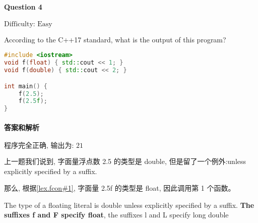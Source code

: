 \documentclass{article}
\begin{document}
	\paragraph*{Question 4} $\boxed{\text{Difficulty: Easy}} $			
	
	According to the C++17 standard, what is the output of this program?
	
	\begin{lstlisting}[language=C++]  		
#include <iostream>
void f(float) { std::cout << 1; }
void f(double) { std::cout << 2; }

int main() {
	f(2.5);
	f(2.5f);
}
	\end{lstlisting}
	
	
	\paragraph*{答案和解析} $\boxed{\text{程序完全正确, 输出为: 21}} $
	
	上一题我们说到, 字面量浮点数 2.5 的类型是 double, 但是留了一个例外:unless explicitly specified by a suffix.
	
	那么, 根据\href{https://timsong-cpp.github.io/cppwp/n4659/lex.fcon#1}{[lex.fcon\#1]},  字面量 2.5f 的类型是 float, 因此调用第 1 个函数。
	\begin{lightgrayleftbar}
	The type of a floating literal is double unless explicitly specified by a suffix. \textbf{The suffixes f and F specify float}, the suffixes l and L specify long double
	\end{lightgrayleftbar}
\end{document}
